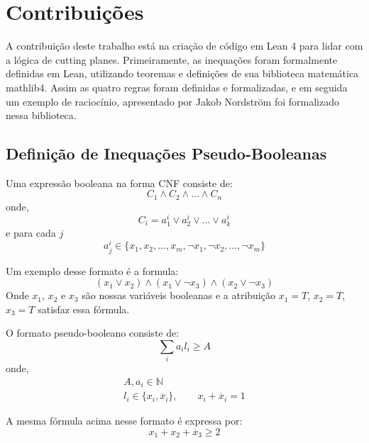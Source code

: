 \documentclass[conference]{IEEEtran}
\begin{document}
\section{Contribuições}
A contribuição deste trabalho está na criação de código em Lean 4 para lidar com a lógica de cutting planes.
Primeiramente, as inequações foram formalmente definidas em Lean, utilizando teoremas e definições de sua biblioteca
matemática mathlib4\cite{mathlib4}. Assim as quatro regras foram definidas e formalizadas, e em seguida um exemplo de
raciocínio, apresentado por Jakob Nordström foi formalizado nessa biblioteca.

\subsection{Definição de Inequações Pseudo-Booleanas}
Uma expressão booleana na forma CNF consiste de:
\begin{equation}
    C_1 \land C_2 \land \dots \land C_n
\end{equation}
onde,
\begin{equation}
    C_i = a_1^i \lor a_2^i \lor \dots \lor a_k^i
\end{equation}
e para cada $j$
\begin{equation}
    a_j^i \in \{ x_1,x_2,\dots,x_m,\neg x_1,\neg x_2,\dots, \neg x_m \}
\end{equation}

Um exemplo desse formato é a formula:
\begin{equation}
    (x_1 \lor x_2) \land (x_1 \lor \neg x_3) \land (x_2 \lor \neg x_3)
\end{equation}
Onde $x_1$, $x_2$ e $x_3$ são nossas variáveis booleanas e a atribuição $x_1=T$, $x_2=T$, $x_3=T$ satisfaz essa fórmula.

O formato pseudo-booleano consiste de:
\begin{equation}
    \sum_i{a_i l_i} \ge A
\end{equation}
onde,
\begin{equation}
    \begin{gathered}
        A, a_i \in \mathbb{N} \\
        l_i \in \{ x_i, \overline x_i \}, \qquad x_i + \overline x_i = 1
    \end{gathered}
\end{equation}

A mesma fórmula acima nesse formato é expressa por:
\begin{equation}
    x_1 + x_2 + \overline x_3 \ge 2
\end{equation}
\end{document}
